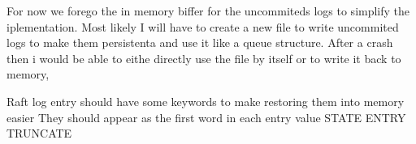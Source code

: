 
For now we forego the in memory biffer for the uncommiteds logs to simplify the iplementation.
Most likely I will have to create a new file to write uncommited logs to make them persistenta and use it like a queue structure.
After a crash then i would be able to eithe directly use the file by itself or to write it back to memory,

Raft log entry should have some keywords to make restoring them into memory easier
They should appear as the first word in each entry value
STATE
ENTRY
TRUNCATE
